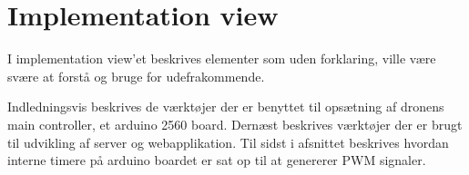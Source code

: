 \section{Implementation view}

I implementation view'et beskrives elementer som uden forklaring, ville være svære at forstå og bruge for udefrakommende. 

Indledningsvis beskrives de værktøjer der er benyttet til opsætning af dronens main controller, et arduino 2560 board. Dernæst beskrives værktøjer der er brugt til udvikling af server og webapplikation. Til sidst i afsnittet beskrives hvordan interne timere på arduino boardet er sat op til at genererer PWM signaler.  



\newpage


\newpage


\newpage
